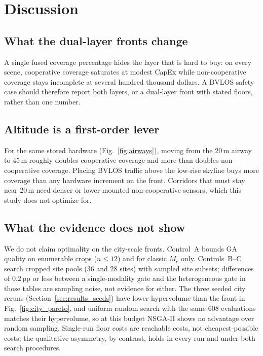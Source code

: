 
\section{Discussion}
\label{sec:discussion}

\subsection{What the dual-layer fronts change}

A single fused coverage percentage hides the layer that is hard to buy: on every scene, cooperative coverage saturates at modest CapEx while non-cooperative coverage stays incomplete at several hundred thousand dollars. A BVLOS safety case should therefore report both layers, or a dual-layer front with stated floors, rather than one number.

\subsection{Altitude is a first-order lever}

For the same stored hardware (Fig.~\ref{fig:airways}), moving from the 20\,m airway to 45\,m roughly doubles cooperative coverage and more than doubles non-cooperative coverage. Placing BVLOS traffic above the low-rise skyline buys more coverage than any hardware increment on the front. Corridors that must stay near 20\,m need denser or lower-mounted non-cooperative sensors, which this study does not optimize for.

\subsection{What the evidence does not show}

We do not claim optimality on the city-scale fronts. Control~A bounds GA quality on enumerable crops (\(n\leq12\)) and for classic \(M_c\) only. Controls~B--C search cropped site pools (36 and 28 sites) with sampled site subsets; differences of \(0.2\)\,pp or less between a single-modality gate and the heterogeneous gate in those tables are sampling noise, not evidence for either. The three seeded city reruns (Section~\ref{sec:results_seeds}) have lower hypervolume than the front in Fig.~\ref{fig:city_pareto}, and uniform random search with the same 608 evaluations matches their hypervolume, so at this budget NSGA-II shows no advantage over random sampling. Single-run floor costs are reachable costs, not cheapest-possible costs; the qualitative asymmetry, by contrast, holds in every run and under both search procedures.

